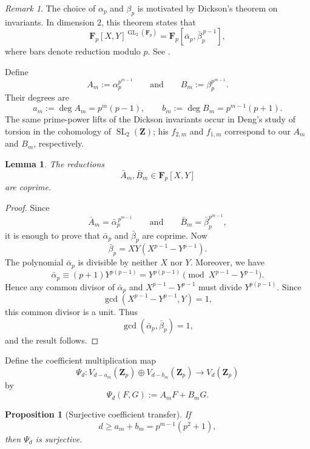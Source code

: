 \documentclass[11pt]{article}
\newcommand{\Z}{\mathbf Z}
\newcommand{\F}{\mathbf F}
\theoremstyle{plain}
\newtheorem{proposition}[theorem]{Proposition}
\newtheorem{lemma}[theorem]{Lemma}
\theoremstyle{definition}
\theoremstyle{remark}
\newtheorem{remark}[theorem]{Remark}
\numberwithin{equation}{section}
\begin{document}
\begin{remark} \label{rem:dickson-motivation} The choice of \(\alpha_p\) and \(\beta_p\) is motivated by Dickson's theorem on invariants. In dimension \(2\), this theorem states that \[ \F_p[X,Y]^{\operatorname{GL}_2(\F_p)} = \F_p[\bar \alpha_p,\bar \beta_p^{\,p-1}], \] where bars denote reduction modulo \(p\). See \cite[Theorem~A, p.~699]{Steinberg1987}. \end{remark} 

Define \[ A_m:=\alpha_p^{p^{m-1}} \qquad\text{and}\qquad B_m:=\beta_p^{p^{m-1}}. \] Their degrees are \[ a_m:=\deg A_m=p^m(p-1), \qquad b_m:=\deg B_m=p^{m-1}(p+1). \] The same prime-power lifts of the Dickson invariants occur in Deng's \cite{Deng2019} study of torsion in the cohomology of \(\operatorname{SL}_2(\mathbf Z)\); his \(f_{2,m}\) and \(f_{1,m}\) correspond to our \(A_m\) and \(B_m\), respectively.

\begin{lemma} \label{lem:coprime-invariants} The reductions \[ \bar A_m,\bar B_m\in\F_p[X,Y] \] are coprime. \end{lemma} 

\begin{proof} Since \[ \bar A_m=\bar \alpha_p^{\,p^{m-1}} \qquad\text{and}\qquad \bar B_m=\bar \beta_p^{p^{m-1}}, \] it is enough to prove that \(\bar \alpha_p\) and \(\bar \beta_p\) are coprime. Now \[ \bar \beta_p = XY(X^{p-1}-Y^{p-1}). \] The polynomial \(\bar \alpha_p\) is divisible by neither \(X\) nor \(Y\). Moreover, we have \[ \bar \alpha_p \equiv (p+1)Y^{p(p-1)} = Y^{p(p-1)} \pmod{X^{p-1} - Y^{p-1}}. \] Hence any common divisor of \(\bar \alpha_p\) and \(X^{p-1}-Y^{p-1}\) must divide \(Y^{p(p-1)}\). Since \[ \gcd(X^{p-1}-Y^{p-1},Y)=1, \] this common divisor is a unit. Thus \[ \gcd(\bar \alpha_p,\bar \beta_p)=1, \] and the result follows. \end{proof} 

Define the coefficient multiplication map \[ \Psi_d: V_{d-a_m}(\Z_p)\oplus V_{d-b_m}(\Z_p) \longrightarrow V_d(\Z_p) \] by \begin{equation} \Psi_d(F,G):=A_mF+B_mG.  \label{eq:mult-map} \end{equation} 

\begin{proposition}[Surjective coefficient transfer]\label{prop:surjective-coefficient-transfer} If \[d\geq a_m+b_m=p^{m-1}(p^2 + 1),\] then $\Psi_d$ is surjective. 
\end{proposition}
\end{document}
